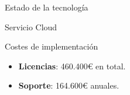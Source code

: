 \begin{chapter}{Estado de la tecnología}
\begin{section}{Servicio Cloud}
\begin{subsection}{Costes de implementación}
        \begin{itemize}
            \item \textbf{Licencias}: 460.400€ en total.
            \item \textbf{Soporte}: 164.600€ anuales.
        \end{itemize}
    \end{subsection}
    
    \end{section}
\end{chapter}